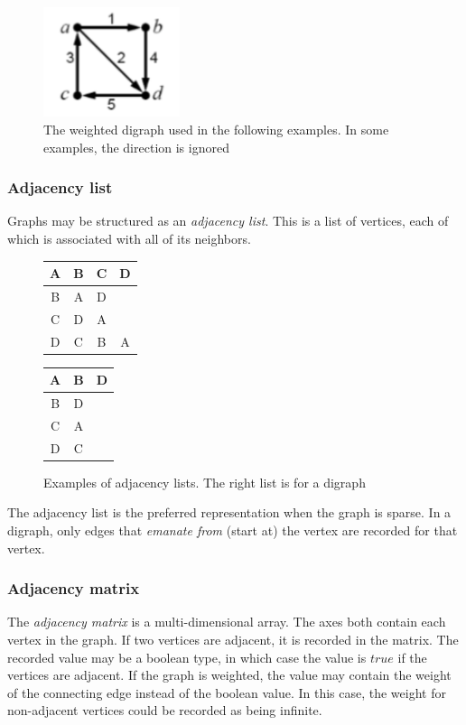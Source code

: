 \documentclass{article}
\begin{document}
\begin{figure}[H]
  \centering
  \includegraphics[width=4cm]{weighted_directed_graph}
  \caption{The weighted digraph used in the following examples. In some examples, the direction is ignored}
\end{figure}

\subsubsection{Adjacency list}
Graphs may be structured as an {\em adjacency list}. This is a list of vertices, each of which is associated with
all of its neighbors.

\begin{figure}[H]
  \centering
  \begin{tabular}{|c|c c c|}
    \hline
    A  & B & C & D  \\ [0.5ex]
    \hline
    B  & A & D & \  \\
    \hline
    C  & D & A & \  \\
    \hline
    D  & C & B & A  \\
    \hline
  \end{tabular}
  \quad
  \begin{tabular}{|c|c c|}
    \hline
    A  & B & D  \\ [0.5ex]
    \hline
    B  & D & \  \\
    \hline
    C  & A & \  \\
    \hline
    D  & C & \  \\
    \hline
  \end{tabular}
  \caption{Examples of adjacency lists. The right list is for a digraph}
\end{figure}

The adjacency list is the preferred representation when the graph is sparse. In a digraph, only edges that {\em emanate from}
(start at) the vertex are recorded for that vertex.

\subsubsection{Adjacency matrix}
The {\em adjacency matrix} is a multi-dimensional array. The axes both contain each vertex in the graph. If two vertices are
adjacent, it is recorded in the matrix. The recorded value may be a boolean type, in which case the value is \(true\) if the
vertices are adjacent. If the graph is weighted, the value may contain the weight of the connecting edge instead of the boolean
value. In this case, the weight for non-adjacent vertices could be recorded as being infinite.
\end{document}
